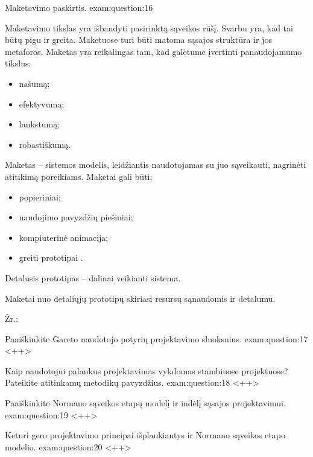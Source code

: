 \begin{question}{%
  Maketavimo paskirtis.
  }{exam:question:16}

  Maketavimo tikslas yra išbandyti pasirinktą sąveikos rūšį. Svarbu yra,
  kad tai būtų pigu ir greita. Maketuose turi būti matoma sąsajos struktūra
  ir jos metaforos. Maketas yra reikalingas tam, kad galėtume įvertinti
  panaudojamumo tikslus:
  \begin{itemize}
    \item našumą;
    \item efektyvumą;
    \item lankstumą;
    \item robastiškumą.
  \end{itemize}

  Maketas – sistemos modelis, leidžiantis naudotojamas su juo sąveikauti,
  nagrinėti atitikimą poreikiams. Maketai gali būti:
  \begin{itemize}
    \item popieriniai;
    \item naudojimo pavyzdžių piešiniai;
    \item kompiuterinė animacija;
    \item greiti prototipai .
  \end{itemize}
  
  Detalusis prototipas – dalinai veikianti sistema.

  Maketai nuo detaliųjų prototipų skiriasi resursų sąnaudomis ir detalumu.

  Žr.: \cite[47--]{skaidres-6}
\end{question}

\begin{question}{%
  Paaiškinkite Gareto naudotojo potyrių projektavimo sluoksnius.
  }{exam:question:17}
  <++>
\end{question}

\begin{question}{%
  Kaip naudotojui palankus projektavimas vykdomas stambiuose projektuose?
  Pateikite atitinkamų metodikų pavyzdžius.
  }{exam:question:18}
  <++>
\end{question}

\begin{question}{%
  Paaiškinkite Normano sąveikos etapų modelį ir indėlį sąsajos
  projektavimui.
  }{exam:question:19}
  <++>
\end{question}

\begin{question}{%
  Keturi gero projektavimo principai išplaukiantys ir Normano sąveikos
  etapo modelio.
  }{exam:question:20}
  <++>
\end{question}
